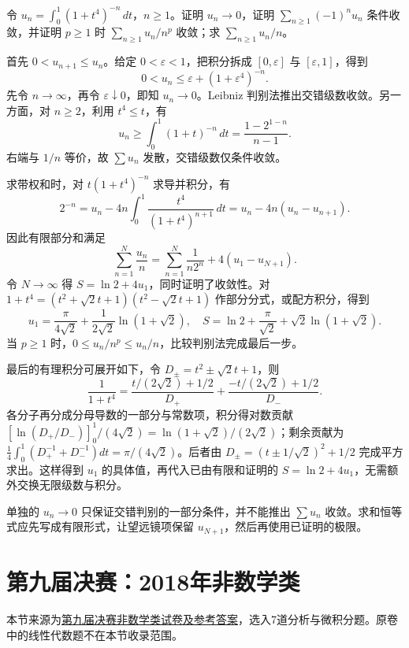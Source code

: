 \documentclass[12pt,fontset=fandol]{ctexart}
\begin{document}
\begin{example}\label{nm-2020-7}
令 $u_n=\int_0^1(1+t^4)^{-n}\,dt$，$n\geq1$。证明 $u_n\to0$，证明 $\sum_{n\geq1}(-1)^nu_n$ 条件收敛，并证明 $p\geq1$ 时 $\sum_{n\geq1}u_n/n^p$ 收敛；求 $\sum_{n\geq1}u_n/n$。
\end{example}
\begin{solve}
首先 $0<u_{n+1}\leq u_n$。给定 $0<\varepsilon<1$，把积分拆成 $[0,\varepsilon]$ 与 $[\varepsilon,1]$，得到
\[
 0<u_n\leq\varepsilon+(1+\varepsilon^4)^{-n}.
\]
先令 $n\to\infty$，再令 $\varepsilon\downarrow0$，即知 $u_n\to0$。Leibniz 判别法推出交错级数收敛。另一方面，对 $n\geq2$，利用 $t^4\leq t$，有
\[
 u_n\geq\int_0^1(1+t)^{-n}\,dt
 =\frac{1-2^{1-n}}{n-1}.
\]
右端与 $1/n$ 等价，故 $\sum u_n$ 发散，交错级数仅条件收敛。

求带权和时，对 $t(1+t^4)^{-n}$ 求导并积分，有
\[
 2^{-n}=u_n-4n\int_0^1\frac{t^4}{(1+t^4)^{n+1}}\,dt
 =u_n-4n(u_n-u_{n+1}).
\]
因此有限部分和满足
\[
 \sum_{n=1}^N\frac{u_n}{n}
 =\sum_{n=1}^N\frac1{n2^n}+4(u_1-u_{N+1}).
\]
令 $N\to\infty$ 得 $S=\ln2+4u_1$，同时证明了收敛性。对 $1+t^4=(t^2+\sqrt2t+1)(t^2-\sqrt2t+1)$ 作部分分式，或配方积分，得到
\[
 u_1=\frac\pi{4\sqrt2}+\frac1{2\sqrt2}\ln(1+\sqrt2),
 \quad S=\ln2+\frac\pi{\sqrt2}+\sqrt2\ln(1+\sqrt2).
\]
当 $p\geq1$ 时，$0\leq u_n/n^p\leq u_n/n$，比较判别法完成最后一步。

最后的有理积分可展开如下，令 $D_\pm=t^2\pm\sqrt2t+1$，则
\[
\frac1{1+t^4}=
\frac{t/(2\sqrt2)+1/2}{D_+}
+\frac{-t/(2\sqrt2)+1/2}{D_-}.
\]
各分子再分成分母导数的一部分与常数项，积分得对数贡献 $[\ln(D_+/D_-)]_0^1/(4\sqrt2)=\ln(1+\sqrt2)/(2\sqrt2)$；剩余贡献为 $\tfrac14\int_0^1(D_+^{-1}+D_-^{-1})dt=\pi/(4\sqrt2)$。后者由 $D_\pm=(t\pm1/\sqrt2)^2+1/2$ 完成平方求出。这样得到 $u_1$ 的具体值，再代入已由有限和证明的 $S=\ln2+4u_1$，无需额外交换无限级数与积分。

\end{solve}
\begin{remark}
单独的 $u_n\to0$ 只保证交错判别的一部分条件，并不能推出 $\sum u_n$ 收敛。求和恒等式应先写成有限形式，让望远镜项保留 $u_{N+1}$，然后再使用已证明的极限。
\end{remark}

\section{第九届决赛：2018年非数学类}
本节来源为\href{https://math.ecnu.edu.cn/llin/pdf_files/NonMathFinalAns2018.pdf}{第九届决赛非数学类试卷及参考答案}，选入7道分析与微积分题。原卷中的线性代数题不在本节收录范围。
\end{document}
